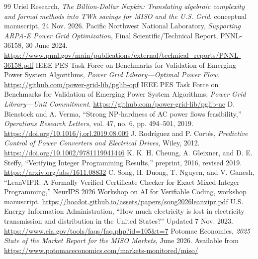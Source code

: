\documentclass[11pt,letterpaper]{article}
\begin{document}
\begin{thebibliography}{99}
 Uriel Research, \emph{The Billion-Dollar Napkin: Translating algebraic complexity and formal methods into TWh savings for MISO and the U.S. Grid}, conceptual manuscript, 24 Nov. 2026.
 Pacific Northwest National Laboratory, \emph{Supporting ARPA-E Power Grid Optimization}, Final Scientific/Technical Report, PNNL-36158, 30 June 2024. \url{https://www.pnnl.gov/main/publications/external/technical_reports/PNNL-36158.pdf}
 IEEE PES Task Force on Benchmarks for Validation of Emerging Power System Algorithms, \emph{Power Grid Library---Optimal Power Flow}. \url{https://github.com/power-grid-lib/pglib-opf}
 IEEE PES Task Force on Benchmarks for Validation of Emerging Power System Algorithms, \emph{Power Grid Library---Unit Commitment}. \url{https://github.com/power-grid-lib/pglib-uc}
 D. Bienstock and A. Verma, ``Strong NP-hardness of AC power flows feasibility,'' \emph{Operations Research Letters}, vol. 47, no. 6, pp. 494--501, 2019. \url{https://doi.org/10.1016/j.orl.2019.08.009}
 J. Rodr\'iguez and P. Cort\'es, \emph{Predictive Control of Power Converters and Electrical Drives}, Wiley, 2012. \url{https://doi.org/10.1002/9781119941446}
 K. K. H. Cheung, A. Gleixner, and D. E. Steffy, ``Verifying Integer Programming Results,'' preprint, 2016, revised 2019. \url{https://arxiv.org/abs/1611.08832}
 C. Song, H. Duong, T. Nguyen, and V. Ganesh, ``LeanVIPR: A Formally Verified Certificate Checker for Exact Mixed-Integer Programming,'' NeurIPS 2026 Workshop on AI for Verifiable Coding, workshop manuscript. \url{https://hocdot.github.io/assets/papers/song2026leanvipr.pdf}
 U.S. Energy Information Administration, ``How much electricity is lost in electricity transmission and distribution in the United States?'' Updated 7 Nov. 2023. \url{https://www.eia.gov/tools/faqs/faq.php?id=105&t=7}
 Potomac Economics, \emph{2025 State of the Market Report for the MISO Markets}, June 2026. Available from \url{https://www.potomaceconomics.com/markets-monitored/miso/}


\end{thebibliography}
\end{document}
